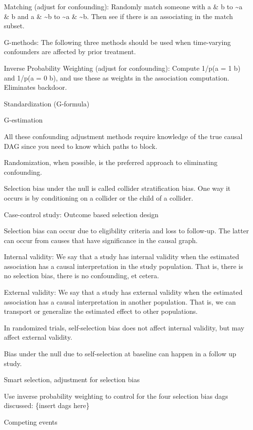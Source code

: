 \documentclass[]{book}
\begin{document}
Matching (adjust for confounding): Randomly match someone with a \& b to
\textasciitilde{}a \& b and a \& \textasciitilde{}b to
\textasciitilde{}a \& \textasciitilde{}b. Then see if there is an
associating in the match subset.

G-methods: The following three methods should be used when time-varying
confounders are affected by prior treatment.

Inverse Probability Weighting (adjust for confounding): Compute 1/p(a =
1 \textbar{} b) and 1/p(a = 0 \textbar{} b), and use these as weights in
the association computation. Eliminates backdoor.

Standardization (G-formula)

G-estimation

All these confounding adjustment methods require knowledge of the true
causal DAG since you need to know which paths to block.

Randomization, when possible, is the preferred approach to eliminating
confounding.

Selection bias under the null is called collider stratification bias.
One way it occurs is by conditioning on a collider or the child of a
collider.

Case-control study: Outcome based selection design

Selection bias can occur due to eligibility criteria and loss to
follow-up. The latter can occur from causes that have significance in
the causal graph.

Internal validity: We say that a study has internal validity when the
estimated association has a causal interpretation in the study
population. That is, there is no selection bias, there is no
confounding, et cetera.

External validity: We say that a study has external validity when the
estimated association has a causal interpretation in another population.
That is, we can transport or generalize the estimated effect to other
populations.

In randomized trials, self-selection bias does not affect internal
validity, but may affect external validity.

Bias under the null due to self-selection at baseline can happen in a
follow up study.

Smart selection, adjustment for selection bias

Use inverse probability weighting to control for the four selection bias
dags discussed: \{insert dags here\}

Competing events
\end{document}
